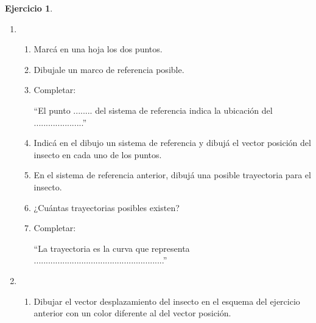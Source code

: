 \documentclass[a4paper,12pt,twoside]{book}
\newtheorem{ejercicio}{{Ejercicio}}[chapter]
\begin{document}
\begin{mdframed}[style=ejercicio-conceptual]
    \begin{ejercicio}
    \end{ejercicio}

    \begin{enumerate}
        \item {}

        \begin{enumerate}
            \item Marcá en una hoja los dos puntos.
        
            \item Dibujale un marco de referencia posible.
            
            \item Completar:
            
            ``El punto ........ del sistema de referencia indica la ubicación del .....................''
            
            \item Indicá en el dibujo un sistema de referencia y dibujá el vector posición del insecto en cada uno de los puntos.
        
            \item En el sistema de referencia anterior, dibujá una posible trayectoria para el insecto.
            
            \item ¿Cuántas trayectorias posibles existen?
            
            \item Completar:
            
            ``La trayectoria es la curva que representa .......................................................''
        \end{enumerate}

        \item {}

        \begin{enumerate}
            \item Dibujar el vector desplazamiento del insecto en el esquema del ejercicio anterior con un color diferente al del vector posición.


\end{enumerate}
\end{enumerate}
\end{mdframed}
\end{document}
